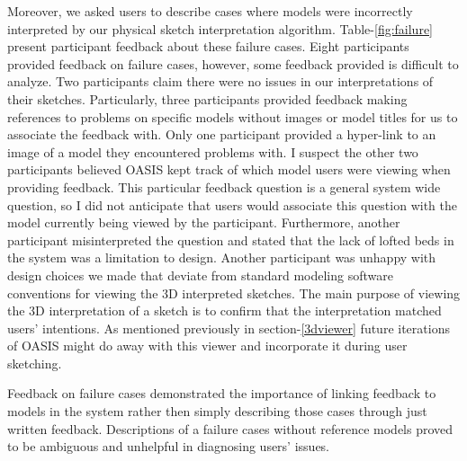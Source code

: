 Moreover, we asked users to describe cases where models were incorrectly interpreted by our physical sketch interpretation algorithm.
Table-\ref{fig:failure} present participant feedback about these failure cases.
Eight participants provided feedback on failure cases, however, some feedback provided is difficult to analyze.
Two  participants claim there were no issues in our interpretations of their sketches.
Particularly, three participants provided feedback making references to problems on specific models without images or model titles for us to associate the feedback with.
Only one participant provided a hyper-link to an image of a model they encountered problems with.
I suspect the other two participants believed OASIS kept track of which model users were viewing when providing feedback.
This particular feedback question is a general system wide question, so I did not anticipate that users would associate this question with the model currently being viewed by the participant.
Furthermore, another participant misinterpreted the question and stated that the lack of lofted beds in the system was a limitation to design.
Another participant was unhappy with design choices we made that deviate from standard modeling software conventions for viewing the 3D interpreted sketches. 
The main purpose of viewing the  3D interpretation of a sketch is to confirm that the interpretation matched users' intentions. As mentioned previously in section-\ref{3dviewer} future iterations of OASIS might do away with this viewer and incorporate it during user sketching.

Feedback on failure cases demonstrated the importance of linking feedback to models in the system rather then  simply describing those cases through just written feedback.
Descriptions of a failure cases without reference models proved to be ambiguous and unhelpful in  diagnosing users' issues.



